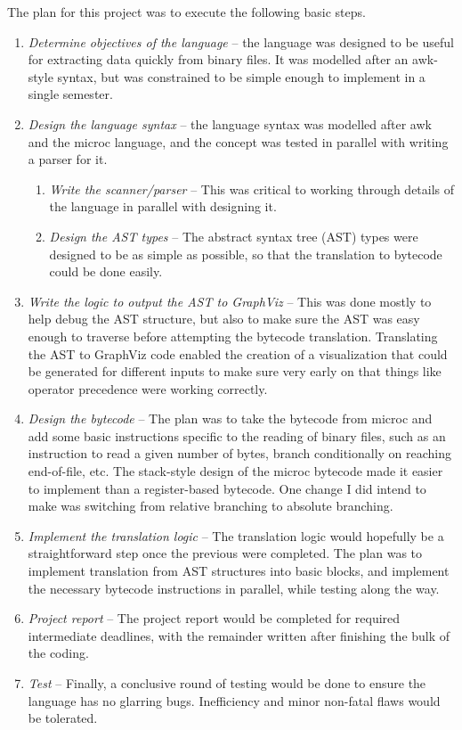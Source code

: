 The plan for this project was to execute the following basic steps.

\begin{enumerate}
\item \textsl{Determine objectives of the language} -- the language was designed to be useful for extracting data quickly from binary files.  It was modelled after an awk-style syntax, but was constrained to be simple enough to implement in a single semester.

\item \textsl{Design the language syntax} -- the language syntax was modelled after awk and the microc language, and the concept was tested in parallel with writing a parser for it.
\begin{enumerate}
	\item \textsl{Write the scanner/parser} -- This was critical to working through details of the language in parallel with designing it.
	\item \textsl{Design the AST types} -- The abstract syntax tree (AST) types were designed to be as simple as possible, so that the translation to bytecode could be done easily.
\end{enumerate}

\item \textsl{Write the logic to output the AST to GraphViz} -- This was done mostly to help debug the AST structure, but also to make sure the AST was easy enough to traverse before attempting the bytecode translation.  Translating the AST to GraphViz code enabled the creation of a visualization that could be generated for different inputs to make sure very early on that things like operator precedence were working correctly.

\item \textsl{Design the bytecode} -- The plan was to take the bytecode from microc and add some basic instructions specific to the reading of binary files, such as an instruction to read a given number of bytes, branch conditionally on reaching end-of-file, etc.  The stack-style design of the microc bytecode made it easier to implement than a register-based bytecode.  One change I did intend to make was switching from relative branching to absolute branching.

\item \textsl{Implement the translation logic} -- The translation logic would hopefully be a straightforward step once the previous were completed.  The plan was to implement translation from AST structures into basic blocks, and implement the necessary bytecode instructions in parallel, while testing along the way.

\item \textsl{Project report} -- The project report would be completed for required intermediate deadlines, with the remainder written after finishing the bulk of the coding.

\item \textsl{Test} -- Finally, a conclusive round of testing would be done to ensure the language has no glarring bugs.  Inefficiency and minor non-fatal flaws would be tolerated.
\end{enumerate}


